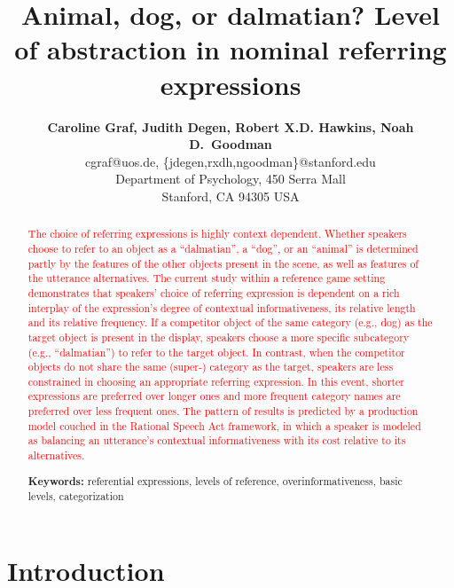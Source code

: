 \documentclass[10pt,letterpaper]{article}
\title{Animal, dog, or dalmatian? Level of abstraction in nominal referring expressions}
\author{{\large \bf Caroline Graf, Judith Degen, Robert X.D. Hawkins, Noah D.~Goodman} \\
  cgraf@uos.de, \{jdegen,rxdh,ngoodman\}@stanford.edu\\
  Department of Psychology, 450 Serra Mall \\
  Stanford, CA 94305 USA}
\newcommand{\red}[1]{\textcolor{Red}{#1}}
\begin{document}
\maketitle


\begin{abstract}

\red{The choice of referring expressions is highly context dependent. Whether speakers choose to refer to an object as a ``dalmatian'', a ``dog'', or an ``animal'' is determined partly by the features of the other objects present in the scene, as well as features of the utterance alternatives. The current study within a reference game setting demonstrates that speakers' choice of referring expression is dependent on a rich interplay of the expression's degree of contextual informativeness, its relative length and its relative frequency. If a competitor object of the same category (e.g., dog) as the target object is present in the display, speakers choose a more specific subcategory (e.g., ``dalmatian'') to refer to the target object. In contrast, when the competitor objects do not share the same (super-) category as the target, speakers are less constrained in choosing an appropriate referring expression. In this event, shorter expressions are preferred over longer ones and more frequent category names are preferred over less frequent ones. The pattern of results is predicted by a production model couched in the Rational Speech Act framework, in which a speaker is modeled as balancing an utterance's contextual informativeness with its cost relative to its alternatives.}

\textbf{Keywords:} 
referential expressions, levels of reference, overinformativeness, basic levels, categorization
\end{abstract}

\section{\bf Introduction}
\end{document}
